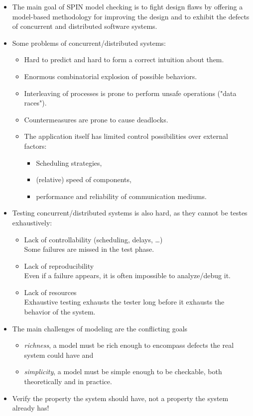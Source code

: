 \documentclass[a4paper, 11pt, accentcolor = tud3b]{tudreport}
\begin{document}
		\begin{itemize}
			\item The main goal of SPIN model checking is to fight design flaws by offering a model-based methodology for improving the design and to exhibit the defects of concurrent and distributed software systems.
			\item Some problems of concurrent/distributed systems:
				\begin{itemize}
					\item Hard to predict and hard to form a correct intuition about them.
					\item Enormous combinatorial explosion of possible behaviors.
					\item Interleaving of processes is prone to perform unsafe operations ("data races").
					\item Countermeasures are prone to cause deadlocks.
					\item The application itself has limited control possibilities over external factors:
						\begin{itemize}
							\item Scheduling strategies,
							\item (relative) speed of components,
							\item performance and reliability of communication mediums.
						\end{itemize}
				\end{itemize}
			\item Testing concurrent/distributed systems is also hard, as they cannot be testes exhaustively:
				\begin{itemize}
					\item Lack of controllability (scheduling, delays, \dots) \\
					Some failures are missed in the test phase.
					\item Lack of reproducibility \\
					Even if a failure appears, it is often impossible to analyze/debug it.
					\item Lack of resources \\
					Exhaustive testing exhausts the tester long before it exhausts the behavior of the system.
				\end{itemize}
			\item The main challenges of modeling are the conflicting goals
				\begin{itemize}
					\item \textit{richness}, a model must be rich enough to encompass defects the real system could have and
					\item \textit{simplicity}, a model must be simple enough to be checkable, both theoretically and in practice.
				\end{itemize}
			\item Verify the property the system should have, not a property the system already has!
		\end{itemize}
	
\end{document}
